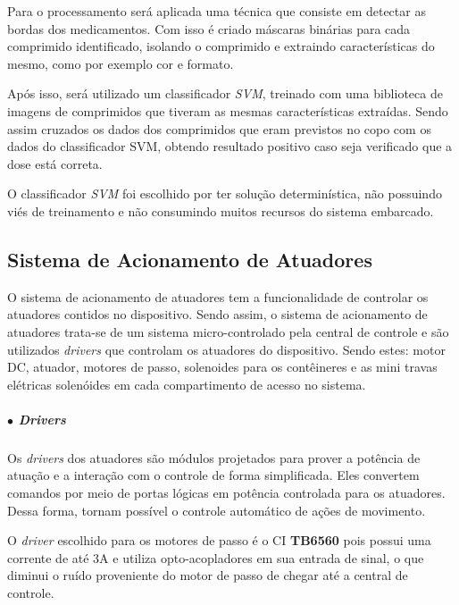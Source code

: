     Para o processamento será aplicada uma técnica que consiste em detectar as bordas dos medicamentos. Com isso é criado máscaras binárias para cada comprimido identificado, isolando o comprimido e extraindo características do mesmo, como por exemplo cor e formato.
    
    Após isso, será utilizado um classificador \textit{SVM}, treinado com uma biblioteca de imagens de comprimidos que tiveram as mesmas características extraídas. Sendo assim cruzados os dados dos comprimidos que eram previstos no copo com os dados do classificador SVM, obtendo resultado positivo caso seja verificado que a dose está correta. 
    
    O classificador \textit{SVM} foi escolhido por ter solução determinística, não possuindo viés de treinamento e não consumindo muitos recursos do sistema embarcado. 

\subsection{Sistema de Acionamento de Atuadores}
     
    O sistema de acionamento de atuadores tem a funcionalidade de controlar os atuadores contidos no dispositivo. Sendo assim, o sistema de acionamento de atuadores  trata-se de um sistema micro-controlado pela central de controle e são utilizados \textit{drivers} que controlam os atuadores do dispositivo. Sendo estes: motor DC, atuador, motores de passo, solenoides para os contêineres e as mini travas elétricas solenóides em cada compartimento de acesso no sistema. 

    \subparagraph*{$\bullet$ Drivers} \hfill
    
    Os \textit{drivers} dos atuadores são módulos projetados para prover a potência de atuação e a interação com o controle de forma simplificada. Eles convertem comandos por meio de portas lógicas em potência controlada para os atuadores. Dessa forma, tornam possível o controle automático de ações de movimento. 
    
    O \textit{driver} escolhido para os motores de passo é o CI \textbf{TB6560} pois possui uma corrente de até 3A e utiliza opto-acopladores em sua entrada de sinal, o que diminui o ruído proveniente do motor de passo de chegar até a central de controle.
    
